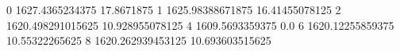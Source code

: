 0 1627.4365234375 17.8671875
1 1625.98388671875 16.41455078125
2 1620.498291015625 10.928955078125
4 1609.5693359375 0.0
6 1620.12255859375 10.55322265625
8 1620.262939453125 10.693603515625
